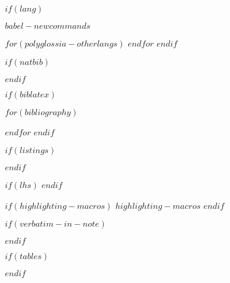 \usepackage[
	colorlinks=false,
   	linkcolor=black,
   	citecolor=black,
  	filecolor=black,
	urlcolor=black,
    bookmarks=true,
    bookmarksopen=true,
    bookmarksopenlevel=3,
    bookmarksnumbered,
    plainpages=false,
    pdfpagelabels=true,
    hyperfootnotes,
    pdftitle ={\docTitle},
    ]{hyperref}




$if(lang)$
    \fi{} %
        \usepackage[shorthands=off,$for(babel-otherlangs)$$babel-otherlangs$$sep$,$endfor$,main=$babel-lang$]{babel}
        $babel-newcommands$
    \else
        \usepackage{polyglossia}
        \setmainlanguage[$polyglossia-lang.options$]{$polyglossia-lang.name$}
        $for(polyglossia-otherlangs)$
        $endfor$
    \fi
$endif$

$if(natbib)$
    \usepackage{natbib}
    
$endif$

$if(biblatex)$
    \usepackage{biblatex}
    $for(bibliography)$
    
    $endfor$
$endif$

$if(listings)$
    \usepackage{listings}
$endif$

$if(lhs)$
$endif$

$if(highlighting-macros)$
    $highlighting-macros$
$endif$

$if(verbatim-in-note)$
    \usepackage{fancyvrb}
    \VerbatimFootnotes %
$endif$

$if(tables)$
    \usepackage{longtable,booktabs}
$endif$

